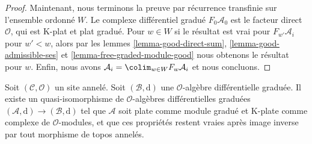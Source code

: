 \begin{proof}
\medskip\noindent
Maintenant, nous terminons la preuve par récurrence transfinie sur l'ensemble ordonné $W$.
Le complexe différentiel gradué $F_0\mathcal{A}_0$ est le facteur direct $\mathcal{O}$, qui est K-plat et plat gradué.
Pour $w \in W$ si le résultat est vrai pour $F_{w'}\mathcal{A}_i$ pour $w' < w$, alors par les lemmes \ref{lemma-good-direct-sum}, \ref{lemma-good-admissible-ses} et \ref{lemma-free-graded-module-good}  nous obtenons le résultat pour $w$.
Enfin, nous avons $\mathcal{A}_i = \colim_{w \in W} F_w\mathcal{A}_i$ et nous concluons.
\end{proof}

\begin{lemma}
\label{lemma-good-dga}
Soit $(\mathcal{C}, \mathcal{O})$ un site annelé.
Soit $(\mathcal{B}, \text{d})$ une $\mathcal{O}$-algèbre différentielle graduée.
Il existe un quasi-isomorphisme de $\mathcal{O}$-algèbres différentielles graduées $(\mathcal{A}, \text{d}) \to (\mathcal{B}, \text{d})$ tel que $\mathcal{A}$ soit plate comme module gradué et K-plate comme complexe de $\mathcal{O}$-modules, et que ces propriétés restent vraies après image inverse par tout morphisme de topos annelés.
\end{lemma}

